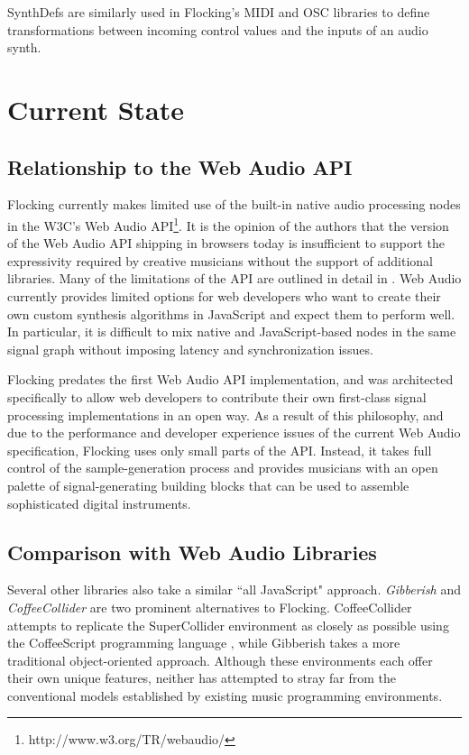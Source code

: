 \documentclass{article}
\begin{document}
SynthDefs are similarly used in Flocking's MIDI and OSC libraries to define transformations between incoming control values and the inputs of an audio synth.

\section{Current State}

\subsection{Relationship to the Web Audio API}

Flocking currently makes limited use of the built-in native audio processing nodes in the W3C's Web Audio API\footnote{http://www.w3.org/TR/webaudio/}. It is the opinion of the authors that the version of the Web Audio API shipping in browsers today is insufficient to support the expressivity required by creative musicians without the support of additional libraries. Many of the limitations of the API are outlined in detail in \cite{DBLP:journals/comj/WyseS13}. Web Audio currently provides limited options for web developers who want to create their own custom synthesis algorithms in JavaScript and expect them to perform well. In particular, it is difficult to mix native and JavaScript-based nodes in the same signal graph without imposing latency and synchronization issues.

Flocking predates the first Web Audio API implementation, and was architected specifically to allow web developers to contribute their own first-class signal processing implementations in an open way. As a result of this philosophy, and due to the performance and developer experience issues of the current Web Audio specification, Flocking uses only small parts of the API. Instead, it takes full control of the sample-generation process and provides musicians with an open palette of signal-generating building blocks that can be used to assemble sophisticated digital instruments.

\subsection{Comparison with Web Audio Libraries}

Several other libraries also take a similar ``all JavaScript" approach. {\it Gibberish} \cite{roberts_web_2013} and {\it CoffeeCollider} \cite{Mohayonao} are two prominent alternatives to Flocking. CoffeeCollider attempts to replicate the SuperCollider environment as closely as possible using the CoffeeScript programming language \cite{Ashkenas}, while Gibberish takes a more traditional object-oriented approach. Although these environments each offer their own unique features, neither has attempted to stray far from the conventional models established by existing music programming environments.
\end{document}
